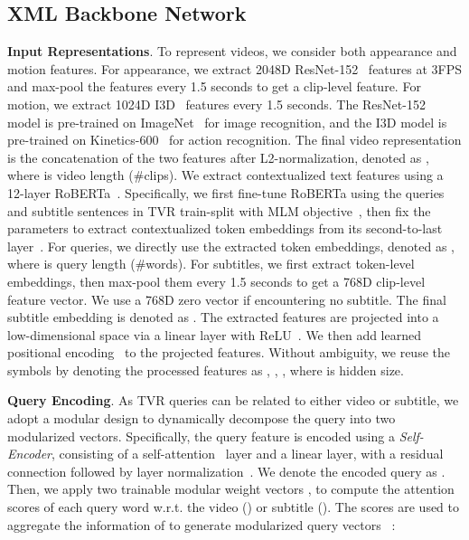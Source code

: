 \documentclass[runningheads]{llncs}
\begin{document}
\subsection{XML Backbone Network}\label{subsec:xml_backbone}
\noindent\textbf{Input Representations}. To represent videos, we consider both appearance and motion features. For appearance, we extract 2048D ResNet-152~\cite{he2016deep} features at 3FPS and max-pool the features every 1.5 seconds to get a clip-level feature. 
For motion, we extract 1024D I3D~\cite{carreira2017quo} features every 1.5 seconds. 
The ResNet-152 model is pre-trained on ImageNet~\cite{deng2009imagenet} for image recognition, and the I3D model is pre-trained on Kinetics-600~\cite{kay2017kinetics} for action recognition. 
The final video representation is the concatenation of the two features after L2-normalization, denoted as , where  is video length (\#clips).
We extract contextualized text features using a 12-layer RoBERTa~\cite{liu2019roberta}. 
Specifically, we first fine-tune RoBERTa using the queries and subtitle sentences in TVR train-split with MLM objective~\cite{devlin2018bert}, then fix the parameters to extract contextualized token embeddings from its second-to-last layer~\cite{lei2019tvqa+}. 
For queries, we directly use the extracted token embeddings, denoted as , where  is query length (\#words). 
For subtitles, we first extract token-level embeddings, then max-pool them every 1.5 seconds to get a 768D clip-level feature vector. 
We use a 768D zero vector if encountering no subtitle.
The final subtitle embedding is denoted as .
The extracted features are projected into a low-dimensional space via a linear layer with ReLU~\cite{glorot2011deep}. 
We then add learned positional encoding~\cite{devlin2018bert} to the projected features. 
Without ambiguity, we reuse the symbols by denoting the processed features as , , , where  is hidden size.


\kern1mm
\noindent\textbf{Query Encoding}.
As TVR queries can be related to either video or subtitle, we adopt a modular design to dynamically decompose the query into two modularized vectors.
Specifically, the query feature is encoded using a \textit{Self-Encoder}, consisting of a self-attention~\cite{vaswani2017attention} layer and a linear layer, with a residual~\cite{he2016deep} connection followed by layer normalization~\cite{ba2016layer}. 
We denote the encoded query as .
Then, we apply two trainable modular weight vectors ,  to compute the attention scores of each query word w.r.t. the video () or subtitle (). 
The scores are used to aggregate the information of  to generate modularized query vectors ~\cite{yu2018mattnet}:
\end{document}
